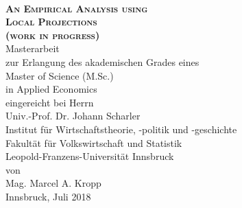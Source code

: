 \documentclass[a4paper,12pt,oneside,pointednumbers,numbers=noenddot,bibtotoc,bigheadings,liststotoc,chapterprefix=true]{scrbook}
\begin{document}
\begin{titlepage}
\begin{center}
        \HRule \\[2mm]
        \Large {\scshape\bfseries An Empirical Analysis using \\
                   Local Projections \\
                   (work in progress)} \\[10mm]
        \large Masterarbeit \\[20mm]
        \large zur Erlangung des akademischen Grades eines \\ Master of Science (M.Sc.)\\
                  in Applied Economics \\[10mm]
                  
        eingereicht bei Herrn\\
        Univ.-Prof. Dr. Johann Scharler \\[10mm]
        Institut für Wirtschaftstheorie, -politik und -geschichte\\
        Fakultät für Volkswirtschaft und Statistik\\
        Leopold-Franzens-Universität Innsbruck \\[10mm]
        von \\ Mag. Marcel A. Kropp \\[10mm]
        Innsbruck, Juli 2018
    \end{center}
\end{titlepage}
\restoregeometry

\thispagestyle{empty} %
\null{}
    \begin{flushright}
    \end{flushright}
\null
\end{document}
